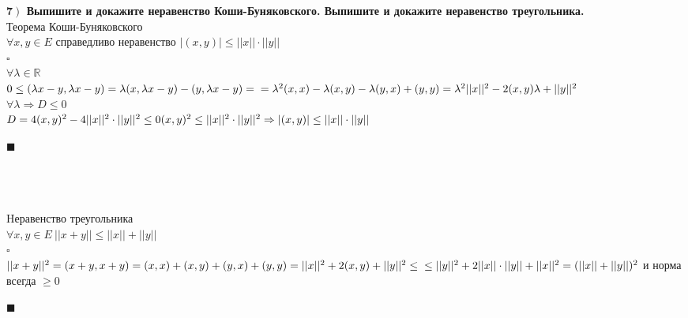 \documentclass[a4paper,12pt]{article}
\begin{document}
    \textbf{7$\left.\right)$ Выпишите и докажите неравенство Коши-Буняковского. Выпишите и докажите неравенство треугольника.}\\ Теорема Коши-Буняковского \\$\forall x, y\in E$ справедливо неравенство $|(x, y)|\leq||x||\cdot||y||$\\
    $\square$\\
    $\forall\lambda\in\mathbb{R}$\\
    $0\leq(\lambda x-y, \lambda x-y)=\lambda(x, \lambda x-y)-(y, \lambda x-y)=\\=\lambda^2(x, x)-\lambda(x, y)-\lambda(y, x)+(y, y)=\lambda^2||x||^2-2(x, y)\lambda+||y||^2$\\
    $\forall\lambda\Rightarrow D\leq0$\\
    $D=4(x, y)^2-4||x||^2\cdot||y||^2\leq0\\
    (x, y)^2\leq||x||^2\cdot||y||^2\Rightarrow|(x, y)|\leq||x||\cdot||y||$
    \begin{flushright}
        $\blacksquare$
    \end{flushright}
    \textbf{}\\\\\\
    Hеравенство треугольника\\
    $\forall x, y\in E\ ||x+y||\leq||x||+||y||$\\
    $\square$\\
    $||x+y||^2=(x+y, x+y)=(x, x)+(x, y)+(y, x)+(y, y)=||x||^2+2(x, y)+||y||^2\leq\\ \\ \\\leq||y||^2+2||x||\cdot||y||+||x||^2=(||x||+||y||)^2$ и норма всегда $\geq0$
    \begin{flushright}
        $\blacksquare$
    \end{flushright}
\end{document}

